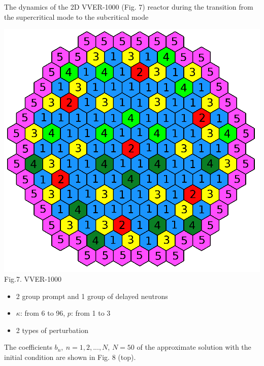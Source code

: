 \documentclass[a1paper,fontscale=0.6]{poster}
\begin{document}
\begin{poster}
{The dynamics of the 2D VVER-1000 (Fig. 7) reactor during the transition from the supercritical mode to the subcritical mode

\begin{minipage}{0.3\textwidth}
\begin{center}
\includegraphics[width=0.8\linewidth]{scmm/geo.png}\\
\footnotesize{Fig.7. VVER-1000}
\end{center}
\end{minipage}
\begin{minipage}{0.7\textwidth}
\begin{itemize}
\setlength\itemsep{0em}
\item 2 group prompt and 1 group of delayed neutrons
\item $\kappa$: from 6 to 96, $p$: from 1 to 3
\item 2 types of perturbation
\end{itemize}
\end{minipage}

\vspace{0.5em}
The coefficients $b_n, \ n = 1,2, ..., N$, $N=50$ of the approximate solution with the initial condition are shown in Fig. 8 (top).

}
\end{poster}
\end{document}
